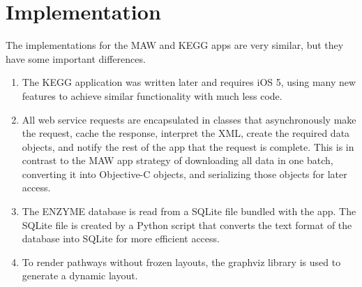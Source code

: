 \section{Implementation}
\label{sect:kegg_implementation}

The implementations for the MAW and KEGG apps are very similar, but they have
some important differences.

\begin{enumerate}

    \item The KEGG application was written later and requires iOS 5, using many
    new features to achieve similar functionality with much less code.

    \item All web service requests are encapsulated in classes that
        asynchronously make the request, cache the response, interpret the XML,
        create the required data objects, and notify the rest of the app that
        the request is complete. This is in contrast to the MAW app strategy of
        downloading all data in one batch, converting it into Objective-C
        objects, and serializing those objects for later access.

    \item The ENZYME database is read from a SQLite file bundled with the app.
        The SQLite file is created by a Python script that converts the text
        format of the database into SQLite for more efficient access.

    \item To render pathways without frozen layouts, the graphviz library is
        used to generate a dynamic layout.

\end{enumerate}
